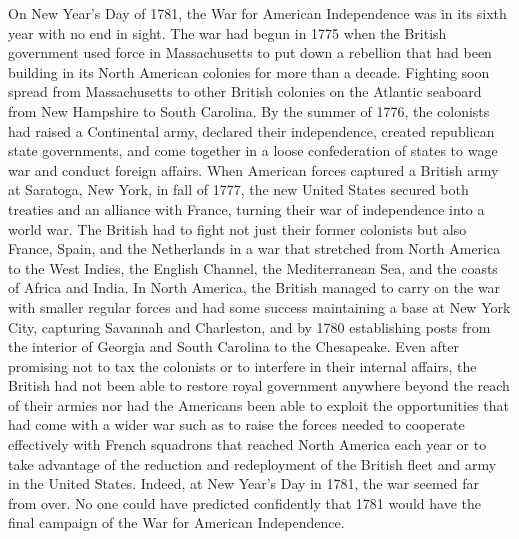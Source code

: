 On New Year's Day of 1781, the War for American Independence was in its sixth
year with no end in sight. The war had begun in 1775 when the British
government used force in Massachusetts to put down a rebellion that had been
building in its North American colonies for more than a decade. Fighting soon
spread from Massachusetts to other British colonies on the Atlantic seaboard
from New Hampshire to South Carolina. By the summer of 1776, the colonists had
raised a Continental army, declared their independence, created republican
state governments, and come together in a loose confederation of states to wage
war and conduct foreign affairs. When American forces captured a British army
at Saratoga, New York, in fall of 1777, the new United States secured both
treaties and an alliance with France, turning their war of independence into a
world war. The British had to fight not just their former colonists but also
France, Spain, and the Netherlands in a war that stretched from North America
to the West Indies, the English Channel, the Mediterranean Sea, and the coasts
of Africa and India. In North America, the British managed to carry on the war
with smaller regular forces and had some success maintaining a base at New York
City, capturing Savannah and Charleston, and by 1780 establishing posts from
the interior of Georgia and South Carolina to the Chesapeake. Even after
promising not to tax the colonists or to interfere in their internal affairs,
the British had not been able to restore royal government anywhere beyond the
reach of their armies nor had the Americans been able to exploit the
opportunities that had come with a wider war such as to raise the forces needed
to cooperate effectively with French squadrons that reached North America each
year or to take advantage of the reduction and redeployment of the British
fleet and army in the United States. Indeed, at New Year's Day in 1781, the war
seemed far from over. No one could have predicted confidently that 1781 would
have the final campaign of the War for American Independence.

